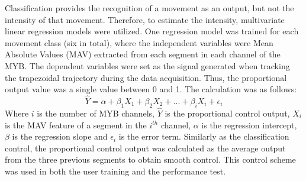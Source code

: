 Classification provides the recognition of a movement as an output, but not the intensity of that movement. Therefore, to estimate the intensity, multivariate linear regression models were utilized. One regression model was trained for each movement class (six in total), where the independent variables were Mean Absolute Values (MAV) extracted from each segment in each channel of the MYB. The dependent variables were set as the signal generated when tracking the trapezoidal trajectory during the data acquisition. Thus, the proportional output value was a single value between 0 and 1. The calculation was as follows: 
\begin{equation} \label{eq:P:multiLinearRegression}
\hat{Y} = \alpha + \beta_1 X_{1} + \beta_2 X_{2} + ... + \beta_i X_{i} + \epsilon_i
\end{equation} 
Where $i$ is the number of MYB channels, $\hat{Y}$ is the proportional control output, $X_{i}$ is the MAV feature of a segment in the $i^{th}$ channel, $\alpha$ is the regression intercept, $\beta$ is the regression slope and $\epsilon_{i}$ is the error term. Similarly as the classification control, the proportional control output was calculated as the average output from the three previous segments to obtain smooth control. This control scheme was used in both the user training and the performance test.